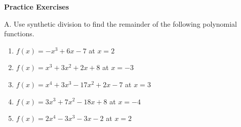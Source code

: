\textbf{Practice Exercises}

\vspce

A. Use synthetic division to find the remainder of the following polynomial functions. 


\begin{enumerate}[label = \arabic*. ]

\item \hspce \hspce $f(x) = -x^3+6x-7$ at $x = 2$ 
\vspce
\item \hspce \hspce $f(x) = x^3+3x^2+2x+8$  at $x = -3$ 
\vspce
\item \hspce \hspce $f(x) = x^4+3x^3-17x^2+2x-7$ at $x=3$ 
\vspce
\item \hspce \hspce $f(x) = 3x^3+7x^2-18x+8$ at $x = -4$ 
\vspce
\item \hspce \hspce $f(x) = 2x^4-3x^3-3x-2$ at $x = 2$ 


\end{enumerate}




